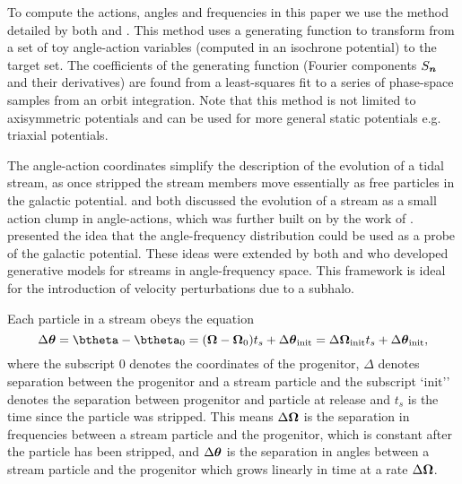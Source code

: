 \documentclass[useAMS,usenatbib,fleqn,a4paper]{mn2e}
\newcommand{\bs}[1]{\bmath{#1}}
\begin{document}
To compute the actions, angles and frequencies in this paper we use the method detailed by both \cite{SandersBinney2014} and \cite{Bovy2014}. This method uses a generating function to transform from a set of toy angle-action variables (computed in an isochrone potential) to the target set. The coefficients of the generating function (Fourier components $S_{\bs{n}}$ and their derivatives) are found from a least-squares fit to a series of phase-space samples from an orbit integration. Note that this method is not limited to axisymmetric potentials and can be used for more general static potentials e.g. triaxial potentials.

The angle-action coordinates simplify the description of the evolution of a tidal stream, as once stripped the stream members move essentially as free particles in the galactic potential. \cite{HelmiWhite1999} and \cite{Tremaine1999} both discussed the evolution of a stream as a small action clump in angle-actions, which was further built on by the work of \cite{EyreBinney2011}. \cite{SandersBinney2013b} presented the idea that the angle-frequency distribution could be used as a probe of the galactic potential. These ideas were extended by both \cite{Bovy2014} and \cite{Sanders2014} who developed generative models for streams in angle-frequency space. This framework is ideal for the introduction of velocity perturbations due to a subhalo.

Each particle in a stream obeys the equation
\begin{equation}\label{linearevol}
\Delta\bs{\theta} = \btheta-\btheta_0 = (\boldsymbol{\Omega}-\boldsymbol{\Omega}_0)t_s +\Delta\bs{\theta}_\mathrm{init}= \Delta\bs{\Omega}_\mathrm{init}t_s+\Delta\bs{\theta}_\mathrm{init},
\end{equation}
where the subscript $0$ denotes the coordinates of the progenitor, $\Delta$ denotes separation between the progenitor and a stream particle and the subscript `$\mathrm{init}$'' denotes the separation between progenitor and particle at release and $t_s$ is the time since the particle was stripped. This means $\Delta\bs{\Omega}$ is the separation in frequencies between a stream particle and the progenitor, which is constant after the particle has been stripped, and $\Delta\bs{\theta}$ is the separation in angles between a stream particle and the progenitor which grows linearly in time at a rate $\Delta\bs{\Omega}$.
\end{document}
